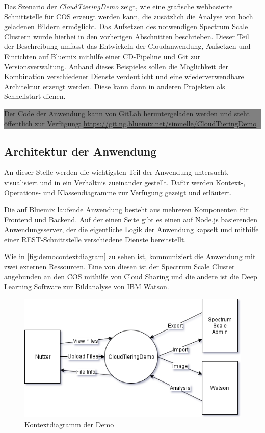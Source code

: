 Das Szenario der \textit{CloudTieringDemo} zeigt, wie eine grafische webbasierte Schnittstelle für \ac{COS} erzeugt werden kann, die zusätzlich die Analyse von hoch geladenen Bildern ermöglicht. Das Aufsetzen des notwendigen Spectrum Scale Clustern wurde hierbei in den vorherigen Abschnitten beschrieben.
Dieser Teil der Beschreibung umfasst das Entwickeln der Cloudanwendung, Aufsetzen und Einrichten auf Bluemix mithilfe einer \ac{CD}-Pipeline und \gls{Git} zur Versionsverwaltung. Anhand dieses Beispieles sollen die Möglichkeit der Kombination verschiedener Dienste verdeutlicht und eine wiederverwendbare Architektur erzeugt werden. Diese kann dann in anderen Projekten als Schnellstart dienen.

\begin{center}
	\colorbox{gray}{\parbox{0.9\textwidth}{Der Code der Anwendung kann von GitLab heruntergeladen werden und steht öffentlich zur Verfügung: \url{https://git.ng.bluemix.net/simuelle/CloudTieringDemo}}}
\end{center}

\subsection{Architektur der Anwendung}
An dieser Stelle werden die wichtigsten Teil der Anwendung untersucht, visualisiert und in ein Verhältnis zueinander gestellt. Dafür werden Kontext-, Operations- und Klassendiagramme zur Verfügung gezeigt und erläutert.

Die auf Bluemix laufende Anwendung besteht aus mehreren Komponenten für Frontend und Backend. Auf der einen Seite gibt es einen auf Node.js basierenden Anwendungsserver, der die eigentliche Logik der Anwendung kapselt und mithilfe einer \gls{REST}-Schnittstelle verschiedene Dienste bereitstellt.

Wie in \autoref{fig:democontextdiagram} zu sehen ist, kommuniziert die Anwendung mit zwei externen Ressourcen. Eine von diesen ist der Spectrum Scale Cluster angebunden an den \ac{COS} mithilfe von Cloud Sharing und die andere ist die Deep Learning Software zur Bildanalyse von IBM Watson.

\begin{figure}[hbt]
	\centering
	\includegraphics[scale=0.75]{images/demo-context-diagram}
	\caption{Kontextdiagramm der Demo}
	\label{fig:democontextdiagram}
\end{figure}

